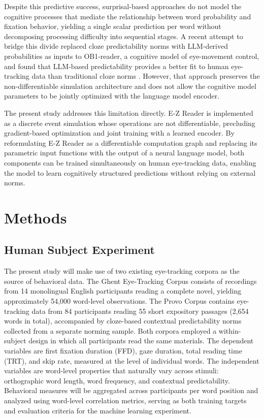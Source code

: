 \documentclass[12pt]{article}
\begin{document}
Despite this predictive success, surprisal-based approaches do not model the
cognitive processes that mediate the relationship between word probability and
fixation behavior, yielding a single scalar prediction per word without
decomposing processing difficulty into sequential stages. A recent attempt to
bridge this divide replaced cloze predictability norms with LLM-derived
probabilities as inputs to OB1-reader, a cognitive model of eye-movement
control, and found that LLM-based predictability provides a better fit to
human eye-tracking data than traditional cloze norms
\citep{lopesrego2024language}. However, that approach preserves the
non-differentiable simulation architecture and does not allow the cognitive
model parameters to be jointly optimized with the language model encoder.

The present study addresses this limitation directly. E-Z Reader is implemented
as a discrete event simulation whose operations are not differentiable,
precluding gradient-based optimization and joint training with a learned
encoder. By reformulating E-Z Reader as a differentiable computation graph and
replacing its parametric input functions with the output of a neural language
model, both components can be trained simultaneously on human eye-tracking
data, enabling the model to learn cognitively structured predictions without
relying on external norms.

\section{Methods}

\subsection{Human Subject Experiment}

The present study will make use of two existing eye-tracking corpora as the
source of behavioral data. The Ghent Eye-Tracking Corpus
\citep[GECO;][]{cop2017presenting} consists of recordings from 14 monolingual
English participants reading a complete novel, yielding approximately 54,000
word-level observations. The Provo Corpus \citep{luke2018provo} contains
eye-tracking data from 84 participants reading 55 short expository passages
(2,654 words in total), accompanied by cloze-based contextual predictability
norms collected from a separate norming sample. Both corpora employed a
within-subject design in which all participants read the same materials. The
dependent variables are first fixation duration (FFD), gaze duration, total
reading time (TRT), and skip rate, measured at the level of individual words.
The independent variables are word-level properties that naturally vary across
stimuli: orthographic word length, word frequency, and contextual
predictability. Behavioral measures will be aggregated across participants per
word position and analyzed using word-level correlation metrics, serving as
both training targets and evaluation criteria for the machine learning
experiment.
\end{document}

